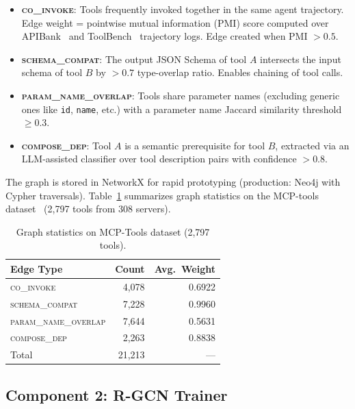 \documentclass[conference]{IEEEtran}
\begin{document}
\begin{itemize}
    \item \textbf{\textsc{co\_invoke}}: Tools frequently invoked
    together in the same agent trajectory. Edge weight = pointwise
    mutual information (PMI) score computed over
    APIBank~\cite{li2023apibank} and ToolBench~\cite{qin2023toolllm}
    trajectory logs. Edge created when PMI $> 0.5$.

    \item \textbf{\textsc{schema\_compat}}: The output JSON Schema
    of tool $A$ intersects the input schema of tool $B$ by $>0.7$
    type-overlap ratio. Enables chaining of tool calls.

    \item \textbf{\textsc{param\_name\_overlap}}: Tools share parameter names (excluding generic ones like \texttt{id}, \texttt{name}, etc.) with a parameter name Jaccard similarity threshold $\ge 0.3$.

    \item \textbf{\textsc{compose\_dep}}: Tool $A$ is a semantic
    prerequisite for tool $B$, extracted via an LLM-assisted
    classifier over tool description pairs with confidence $> 0.8$.
\end{itemize}

The graph is stored in NetworkX for rapid prototyping (production:
Neo4j with Cypher traversals). Table~\ref{tab:graph_stats}
summarizes graph statistics on the MCP-tools
dataset~\cite{fei2025mcpzero} (2,797 tools from 308 servers).

\begin{table}[htbp]
\centering
\caption{Graph statistics on MCP-Tools dataset (2,797 tools).}
\label{tab:graph_stats}
\begin{tabular}{lrr}
\toprule
Edge Type & Count & Avg.\ Weight \\
\midrule
\textsc{co\_invoke}          & 4,078 & 0.6922 \\
\textsc{schema\_compat}      & 7,228 & 0.9960 \\
\textsc{param\_name\_overlap} & 7,644 & 0.5631 \\
\textsc{compose\_dep}        & 2,263 & 0.8838 \\
\midrule
Total                         & 21,213 & --- \\
\bottomrule
\end{tabular}
\end{table}

\subsection{Component 2: R-GCN Trainer}
\end{document}
